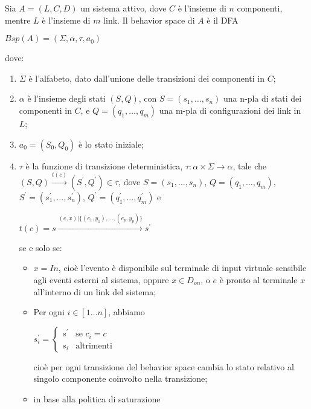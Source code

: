 \begin{defn}
Sia $A = (L,C,D)$ un sistema attivo, dove $C$ è l'insieme di $n$ componenti, mentre $L$ è l'insieme di $m$ link. Il behavior space di $A$ è il DFA
\begin{center}
	$Bsp(A) = (\Sigma,\alpha,\tau,a_0)$
\end{center}
dove:
\begin{enumerate}
\item $\Sigma$ è l'alfabeto, dato dall'unione delle transizioni dei componenti in $C$;
\item $\alpha$  è l'insieme degli stati $(S,Q)$, con $S = (s_1,\ldots,s_n)$ una n-pla di stati dei componenti in $C$, e $Q = (q_1, \ldots,q_m)$ una m-pla di configurazioni dei link in $L$;
\item $a_0 = (S_0,Q_0)$ è lo stato iniziale;
\item $\tau$ è la funzione di transizione deterministica, $\tau: \alpha \times \Sigma \rightarrow \alpha$, tale che $(S,Q) \xrightarrow{t(c)} (S^\prime, Q^\prime) \in \tau$, dove $S = (s_1, \ldots,s_n)$, $Q = (q_1, \ldots,q_m)$, $S^\prime = (s^\prime_1, \ldots,s^\prime_n)$, $Q^\prime = (q^\prime_1, \ldots,q^\prime_m)$ e
\begin{center}
$t(c) = s \xrightarrow{(e,x) | \{(e_1,y_1), \ldots, (e_p,y_p)\}} s^\prime$
\end{center}
se e solo se:
\begin{itemize}
\item $x = In$, cioè l'evento è disponibile sul terminale di input virtuale sensibile agli eventi esterni al sistema, oppure $x \in D_{on}$, o $e$ è pronto al terminale $x$ all'interno di un link del sistema;
\item Per ogni $i \in [1 \ldots n]$, abbiamo
\begin{center}
$s^\prime_i = \begin{cases} s^\prime & \mbox{se }c_i = c\\ s_i & \mbox{altrimenti} \end{cases}$
\end{center}
cioè per ogni transizione del behavior space cambia lo stato relativo al singolo componente coinvolto nella transizione;
\item in base alla politica di saturazione
\end{itemize}
\end{enumerate}
\end{defn}


